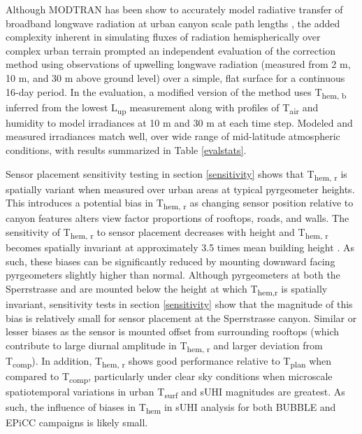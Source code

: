 \begin{bibunit}
Although MODTRAN has been show to accurately model radiative transfer of broadband longwave radiation at urban canyon scale path lengths \citep{Hoch2005, Hoch2007}, the added complexity inherent in simulating fluxes of radiation hemispherically over complex urban terrain prompted an independent evaluation of the correction method using observations of upwelling longwave radiation (measured from 2 \si{\meter}, 10 \si{\meter}, and 30 \si{\meter} above ground level) over a simple, flat surface for a continuous 16-day period. In the evaluation, a modified version of the method uses T\textsubscript{hem, b} inferred from the lowest L\textsubscript{up} measurement along with profiles of T\textsubscript{air} and humidity to model irradiances at 10 \si{\meter} and 30 \si{\meter} at each time step. Modeled and measured irradiances match well, over wide range of mid-latitude atmospheric conditions, with results summarized in Table \ref{evalstats}.

Sensor placement sensitivity testing in section \ref{sensitivity} shows that T\textsubscript{hem, r} is spatially variant when measured over urban areas at typical pyrgeometer heights. This introduces a potential bias in T\textsubscript{hem, r} as changing sensor position relative to canyon features alters view factor proportions of rooftops, roads, and walls. The sensitivity of T\textsubscript{hem, r} to sensor placement decreases with height and T\textsubscript{hem, r} becomes spatially invariant at approximately 3.5 times mean building height \citep{Roberts2010,Adderley2015}. As such, these biases can be significantly reduced by mounting downward facing pyrgeometers slightly higher than normal. Although pyrgeometers at both the Sperrstrasse and are mounted below the height at which T\textsubscript{hem,r} is spatially invariant, sensitivity tests in section \ref{sensitivity} show that the magnitude of this bias is relatively small for sensor placement at the Sperrstrasse canyon. Similar or lesser biases as the sensor is mounted offset from surrounding rooftops (which contribute to large diurnal amplitude in T\textsubscript{hem, r} and larger deviation from T\textsubscript{comp}). In addition, T\textsubscript{hem, r} shows good performance relative to T\textsubscript{plan} when compared to T\textsubscript{comp}, particularly under clear sky conditions when microscale spatiotemporal variations in urban T\textsubscript{surf} and sUHI magnitudes are greatest. As such, the influence of biases in T\textsubscript{hem} in sUHI analysis for both BUBBLE and EPiCC campaigns is likely small.


\end{bibunit}
